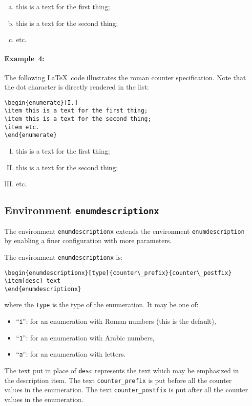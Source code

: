 \documentclass[book]{upmethodology-document}
\begin{document}
\begin{enumerate}[(a)]
\item this is a text for the first thing;
\item this is a text for the second thing;
\item etc.
\end{enumerate}

\paragraph{Example~4:} The following \LaTeX~code illustrates the roman counter specification. Note that the dot character is directly rendered in the list:
\begin{verbatim}
\begin{enumerate}[I.]
\item this is a text for the first thing;
\item this is a text for the second thing;
\item etc.
\end{enumerate}
\end{verbatim}

\begin{enumerate}[I.]
\item this is a text for the first thing;
\item this is a text for the second thing;
\item etc.
\end{enumerate}

\subsection{Environment \texttt{enumdescriptionx}}

The environment \texttt{enumdescriptionx} extends the environment \texttt{enumdescription} by enabling a finer configuration with more parameters.


The environment \texttt{enumdescriptionx} is:
\begin{verbatim}
\begin{enumdescriptionx}[type]{counter\_prefix}{counter\_postfix}
\item[desc] text
\end{enumdescriptionx}
\end{verbatim}
where the \texttt{type} is the type of the enumeration. It may be one of:
\begin{itemize}
\item ``\texttt{i}'': for an enumeration with Roman numbers (this is the default),
\item ``\texttt{1}'': for an enumeration with Arabic numbers,
\item ``\texttt{a}'': for an enumeration with letters.
\end{itemize}
The text put in place of \texttt{desc} represents the text which may be emphasized in the description item.
The text \texttt{counter\_prefix} is put before all the counter values in the enumeration.
The text \texttt{counter\_postfix} is put after all the counter values in the enumeration.
\end{document}
